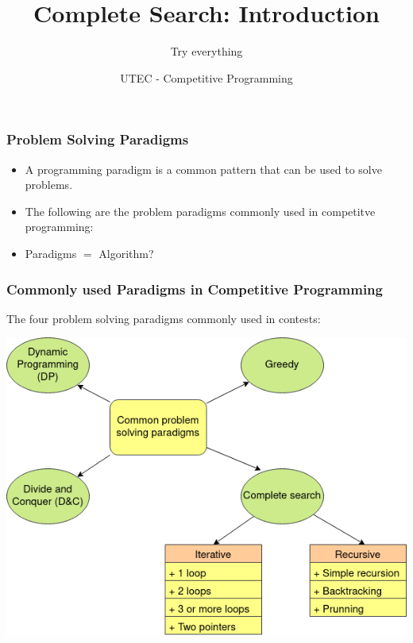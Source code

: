 \documentclass{beamer}
\begin{document}
\newcommand{\tabitem}{~~\llap{\textbullet}~~}




\title{Complete Search: Introduction}
\subtitle{Try everything}
\author{UTEC - Competitive Programming}
\date{}

\maketitle

\begin{frame}
	\frametitle{Problem Solving Paradigms}

	\begin{itemize}
		\item A programming paradigm is a common pattern that can be used to solve problems.
		\item The following are the problem paradigms commonly used in competitve programming:
		\item Paradigms $=$ Algorithm?
	\end{itemize}
\end{frame}

\begin{frame}
	\frametitle{Commonly used Paradigms in Competitive Programming}
	The four problem solving paradigms commonly used in contests:
	\begin{center}
		\includegraphics[scale=0.4]{images/programming-paradigms}
	\end{center}
\end{frame}
\end{document}
